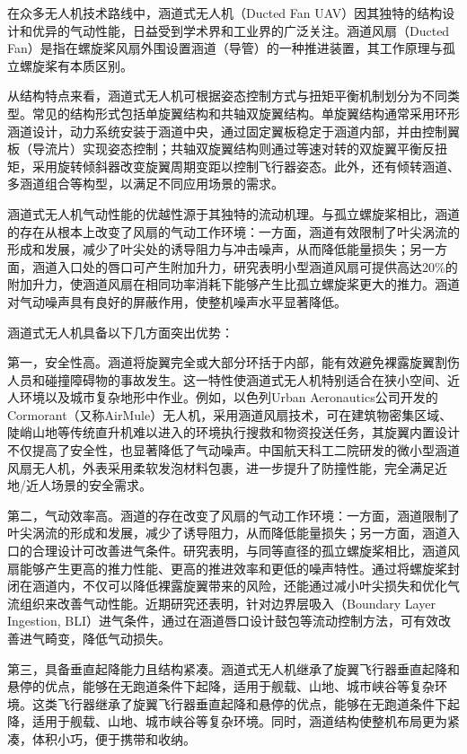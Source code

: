 在众多无人机技术路线中，涵道式无人机（Ducted Fan UAV）因其独特的结构设计和优异的气动性能，日益受到学术界和工业界的广泛关注\cite{renxiaolu}\cite{xuchang}。涵道风扇（Ducted Fan）是指在螺旋桨风扇外围设置涵道（导管）的一种推进装置，其工作原理与孤立螺旋桨有本质区别。

从结构特点来看，涵道式无人机可根据姿态控制方式与扭矩平衡机制划分为不同类型。常见的结构形式包括单旋翼结构和共轴双旋翼结构。单旋翼结构通常采用环形涵道设计，动力系统安装于涵道中央，通过固定翼板稳定于涵道内部，并由控制翼板（导流片）实现姿态控制\cite{lijianbo}；共轴双旋翼结构则通过等速对转的双旋翼平衡反扭矩，采用旋转倾斜器改变旋翼周期变距以控制飞行器姿态。此外，还有倾转涵道、多涵道组合等构型，以满足不同应用场景的需求。

涵道式无人机气动性能的优越性源于其独特的流动机理。与孤立螺旋桨相比，涵道的存在从根本上改变了风扇的气动工作环境：一方面，涵道有效限制了叶尖涡流的形成和发展，减少了叶尖处的诱导阻力与冲击噪声，从而降低能量损失；另一方面，涵道入口处的唇口可产生附加升力，研究表明小型涵道风扇可提供高达20\%的附加升力，使涵道风扇在相同功率消耗下能够产生比孤立螺旋桨更大的推力。涵道对气动噪声具有良好的屏蔽作用，使整机噪声水平显著降低\cite{lijianbo}。

涵道式无人机具备以下几方面突出优势：

第一，安全性高。涵道将旋翼完全或大部分环括于内部，能有效避免裸露旋翼割伤人员和碰撞障碍物的事故发生。这一特性使涵道式无人机特别适合在狭小空间、近人环境以及城市复杂地形中作业。例如，以色列Urban Aeronautics公司开发的Cormorant（又称AirMule）无人机，采用涵道风扇技术，可在建筑物密集区域、陡峭山地等传统直升机难以进入的环境执行搜救和物资投送任务，其旋翼内置设计不仅提高了安全性，也显著降低了气动噪声。中国航天科工二院研发的微小型涵道风扇无人机，外表采用柔软发泡材料包裹，进一步提升了防撞性能，完全满足近地/近人场景的安全需求。

第二，气动效率高。涵道的存在改变了风扇的气动工作环境：一方面，涵道限制了叶尖涡流的形成和发展，减少了诱导阻力，从而降低能量损失；另一方面，涵道入口的合理设计可改善进气条件。研究表明，与同等直径的孤立螺旋桨相比，涵道风扇能够产生更高的推力性能、更高的推进效率和更低的噪声特性\cite{Numerical_and_Experimental_Analyses_of_the_Ducted_Fan}。通过将螺旋桨封闭在涵道内，不仅可以降低裸露旋翼带来的风险，还能通过减小叶尖损失和优化气流组织来改善气动性能\cite{Aerodynamic_performance_assessment_of_a_ducted_fan_UAV}。近期研究还表明，针对边界层吸入（Boundary Layer Ingestion, BLI）进气条件，通过在涵道唇口设计鼓包等流动控制方法，可有效改善进气畸变，降低气动损失\cite{wangshuo}。

第三，具备垂直起降能力且结构紧凑。涵道式无人机继承了旋翼飞行器垂直起降和悬停的优点\cite{Xia}，能够在无跑道条件下起降，适用于舰载、山地、城市峡谷等复杂环境。这类飞行器继承了旋翼飞行器垂直起降和悬停的优点，能够在无跑道条件下起降，适用于舰载、山地、城市峡谷等复杂环境。同时，涵道结构使整机布局更为紧凑，体积小巧，便于携带和收纳。

